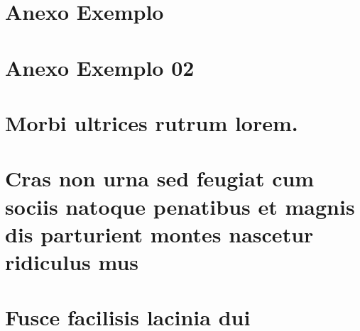 \chapter{Anexo Exemplo}

\lipsum[3-9]

\chapter{Anexo Exemplo 02}

\lipsum[1-4]


\chapter{Morbi ultrices rutrum lorem.}

\lipsum[29-30]


\chapter{Cras non urna sed feugiat cum sociis natoque penatibus et magnis dis parturient montes nascetur ridiculus mus}

\lipsum[31-32]

\chapter{Fusce facilisis lacinia dui}

\lipsum[32-36]